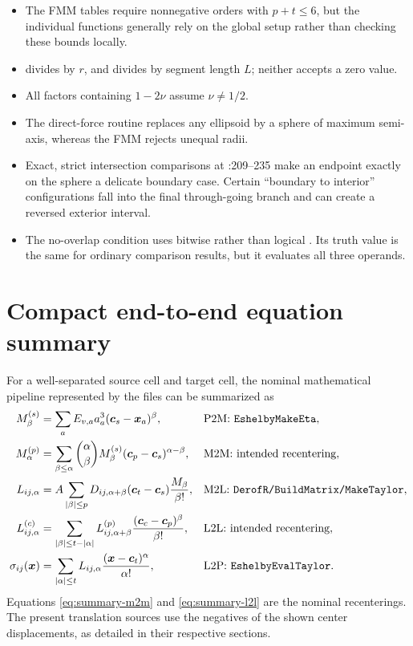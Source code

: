 \documentclass[11pt]{article}
\newcommand{\vect}[1]{\bm{#1}}
\newcommand{\abs}[1]{\left\lvert #1\right\rvert}
\newcommand{\code}[1]{\texttt{\detokenize{#1}}}
\begin{document}
\begin{itemize}
\item The FMM tables require nonnegative orders with \(p+t\leq6\), but the
  individual functions generally rely on the global setup rather than checking
  these bounds locally.
\item \code{EshelbyDerofR} divides by \(r\), and \code{EshelbyForce} divides by
  segment length \(L\); neither accepts a zero value.
\item All factors containing \(1-2\nu\) assume \(\nu\neq1/2\).
\item The direct-force routine replaces any ellipsoid by a sphere of maximum
  semi-axis, whereas the FMM rejects unequal radii.
\item Exact, strict intersection comparisons at
  :209--235 make an endpoint exactly on the sphere a
  delicate boundary case.  Certain ``boundary to interior'' configurations
  fall into the final through-going branch and can create a reversed exterior
  interval.
\item The no-overlap condition uses bitwise \code{|} rather than logical
  \code{||}.  Its truth value is the same for ordinary comparison results, but
  it evaluates all three operands.
\end{itemize}

\section{Compact end-to-end equation summary}

For a well-separated source cell and target cell, the nominal mathematical
pipeline represented by the files can be summarized as
\begin{align}
M_\beta^{(s)}
&=\sum_a E_{v,a}a_a^3
  (\vect{c}_s-\vect{x}_a)^\beta,
&&\text{P2M: \code{EshelbyMakeEta}},
\label{eq:summary-p2m}\\
M_\alpha^{(p)}
&=\sum_{\beta\leq\alpha}\binom{\alpha}{\beta}
  M_\beta^{(s)}
  (\vect{c}_p-\vect{c}_s)^{\alpha-\beta},
&&\text{M2M: intended recentering},
\label{eq:summary-m2m}\\
L_{ij,\alpha}
&=A\sum_{\abs{\beta}\leq p}
  D_{ij,\alpha+\beta}(\vect{c}_t-\vect{c}_s)
  \frac{M_\beta}{\beta!},
&&\text{M2L: \code{DerofR/BuildMatrix/MakeTaylor}},
\label{eq:summary-m2l}\\
L_{ij,\alpha}^{(c)}
&=\sum_{\abs{\beta}\leq t-\abs{\alpha}}
  L_{ij,\alpha+\beta}^{(p)}
  \frac{(\vect{c}_c-\vect{c}_p)^\beta}{\beta!},
&&\text{L2L: intended recentering},
\label{eq:summary-l2l}\\
\sigma_{ij}(\vect{x})
&=\sum_{\abs{\alpha}\leq t}
  L_{ij,\alpha}
  \frac{(\vect{x}-\vect{c}_t)^\alpha}{\alpha!},
&&\text{L2P: \code{EshelbyEvalTaylor}}.
\label{eq:summary-l2p}
\end{align}
Equations \eqref{eq:summary-m2m} and \eqref{eq:summary-l2l} are the nominal
recenterings.  The present translation sources use the negatives of the shown
center displacements, as detailed in their respective sections.
\end{document}
